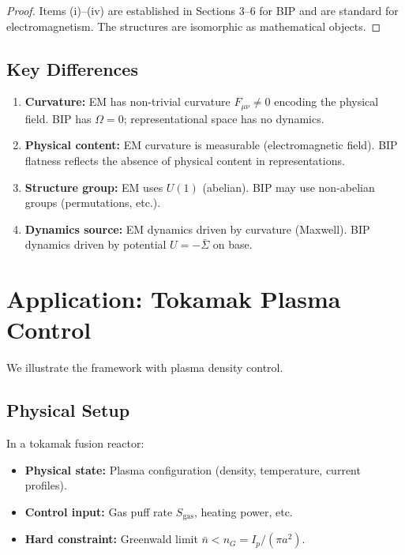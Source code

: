 \documentclass[11pt]{article}
\begin{document}
\begin{proof}
Items (i)--(iv) are established in Sections 3--6 for BIP and are standard for electromagnetism. The structures are isomorphic as mathematical objects.
\end{proof}

\subsection{Key Differences}

\begin{enumerate}
    \item \textbf{Curvature:} EM has non-trivial curvature $F_{\mu\nu} \neq 0$ encoding the physical field. BIP has
    $\Omega = 0$; representational space has no dynamics.

    \item \textbf{Physical content:} EM curvature is measurable (electromagnetic field). BIP flatness
    reflects the absence of physical content in representations.

    \item \textbf{Structure group:} EM uses $U(1)$ (abelian). BIP may use non-abelian groups (permutations, etc.).

    \item \textbf{Dynamics source:} EM dynamics driven by curvature (Maxwell). BIP dynamics driven
    by potential $U = -\bar{\Sigma}$ on base.
\end{enumerate}

\section{Application: Tokamak Plasma Control}

We illustrate the framework with plasma density control.

\subsection{Physical Setup}

In a tokamak fusion reactor:
\begin{itemize}
    \item \textbf{Physical state:} Plasma configuration (density, temperature, current profiles).
    \item \textbf{Control input:} Gas puff rate $S_{\mathrm{gas}}$, heating power, etc.
    \item \textbf{Hard constraint:} Greenwald limit $\bar{n} < n_G = I_p/(\pi a^2)$.
\end{itemize}
\end{document}
